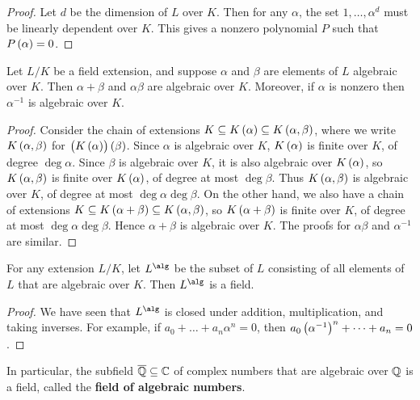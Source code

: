 \begin{proof}
Let $ d $ be the dimension of $ L $ over $ K $. Then for any $ \alpha $, the set $ 1, \dots, \alpha^d $ must be linearly dependent over $ K $. This gives a nonzero polynomial $ P $ such that $ P\br{\alpha} = 0 $.
\end{proof}

\begin{corollary}
Let $ L / K $ be a field extension, and suppose $ \alpha $ and $ \beta $ are elements of $ L $ algebraic over $ K $. Then $ \alpha + \beta $ and $ \alpha\beta $ are algebraic over $ K $. Moreover, if $ \alpha $ is nonzero then $ \alpha^{-1} $ is algebraic over $ K $.
\end{corollary}

\begin{proof}
Consider the chain of extensions $ K \subseteq K\br{\alpha} \subseteq K\br{\alpha, \beta} $, where we write $ K\br{\alpha, \beta} $ for $ \br{K\br{\alpha}}\br{\beta} $. Since $ \alpha $ is algebraic over $ K $, $ K\br{\alpha} $ is finite over $ K $, of degree $ \deg \alpha $. Since $ \beta $ is algebraic over $ K $, it is also algebraic over $ K\br{\alpha} $, so $ K\br{\alpha, \beta} $ is finite over $ K\br{\alpha} $, of degree at most $ \deg \beta $. Thus $ K\br{\alpha, \beta} $ is algebraic over $ K $, of degree at most $ \deg \alpha\deg \beta $. On the other hand, we also have a chain of extensions $ K \subseteq K\br{\alpha + \beta} \subseteq K\br{\alpha, \beta} $, so $ K\br{\alpha + \beta} $ is finite over $ K $, of degree at most $ \deg \alpha\deg \beta $. Hence $ \alpha + \beta $ is algebraic over $ K $. The proofs for $ \alpha\beta $ and $ \alpha^{-1} $ are similar.
\end{proof}

\begin{corollary}
For any extension $ L / K $, let $ L^{\alg} $ be the subset of $ L $ consisting of all elements of $ L $ that are algebraic over $ K $. Then $ L^{\alg} $ is a field.
\end{corollary}

\begin{proof}
We have seen that $ L^{\alg} $ is closed under addition, multiplication, and taking inverses. For example, if $ a_0 + \dots + a_n\alpha^n = 0 $, then $ a_0\br{\alpha^{-1}}^n + \dots + a_n = 0 $.
\end{proof}

\begin{example*}
In particular, the subfield $ \overline{\mathbb{Q}} \subseteq \mathbb{C} $ of complex numbers that are algebraic over $ \mathbb{Q} $ is a field, called the \textbf{field of algebraic numbers}.
\end{example*}

